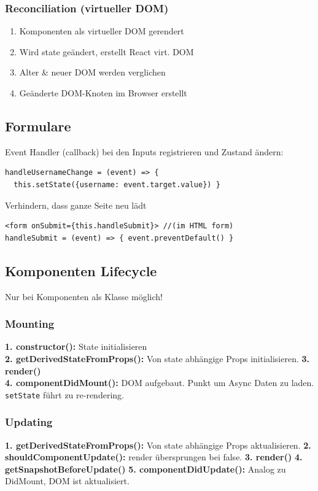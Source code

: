 \subsubsection{Reconciliation (virtueller DOM)}
\begin{enumerate}
    \item Komponenten als virtueller DOM gerendert
    \item Wird state geändert, erstellt React virt. DOM
    \item Alter \& neuer DOM werden verglichen
    \item Geänderte DOM-Knoten im Browser erstellt
\end{enumerate}

\subsection{Formulare}
Event Handler (callback) bei den Inputs registrieren und Zustand ändern:
\begin{lstlisting}[style=JavaScript]
handleUsernameChange = (event) => {
  this.setState({username: event.target.value}) }
\end{lstlisting}
Verhindern, dass ganze Seite neu lädt
\begin{lstlisting}[style=JavaScript]
<form onSubmit={this.handleSubmit}> //(im HTML form)
handleSubmit = (event) => { event.preventDefault() }
\end{lstlisting}

\subsection{Komponenten Lifecycle}
Nur bei Komponenten als Klasse möglich!

\subsubsection{Mounting}
\textbf{1. constructor():} State initialisieren\\
\textbf{2. getDerivedStateFromProps():} Von state abhängige Props initialisieren.
\textbf{3. render()}\\
\textbf{4. componentDidMount():} DOM aufgebaut. Punkt um Async Daten zu laden. \texttt{\tiny setState} führt zu re-rendering.

\subsubsection{Updating}
\textbf{1. getDerivedStateFromProps():} Von state abhängige Props aktualisieren.
\textbf{2. shouldComponentUpdate():} render übersprungen bei false.
\textbf{3. render()}
\textbf{4. getSnapshotBeforeUpdate()}
\textbf{5. componentDidUpdate():} Analog zu DidMount, DOM ist aktualisiert.

